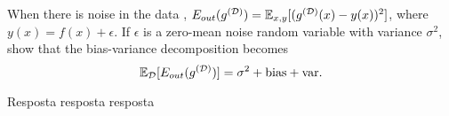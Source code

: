 \begin{enunciado}{22}
   When there is noise in the data , $E_{out}(g^{(\mathcal{D})}) = \mathbb{E}_{x,y} [(g^{(\mathcal{D})} (x) - y(x))^{2}]$, where $y(x) = f(x) + \epsilon$. If $\epsilon$ is a zero-mean noise random variable with variance $\sigma^{2}$, show that the bias-variance decomposition becomes 
   $$\mathbb{E}_{\mathcal{D}} [E_{out} (g^{(\mathcal{D})})] = \sigma^2 + \mbox{bias} + \mbox{var}.$$
   
\end{enunciado}

Resposta resposta resposta
